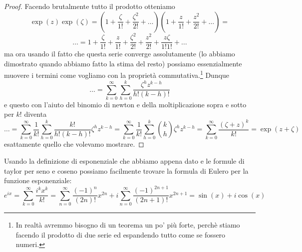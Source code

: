 \documentclass[11pt]{scrartcl}
\begin{document}
	 \begin{proof}
	 	Facendo brutalmente tutto il prodotto otteniamo
	 	$$\exp(z)\exp(\zeta)=\left(1+\frac{\zeta}{1!}+\frac{\zeta^2}{2!}+\dots\right)\left(1+\frac{z}{1!}+\frac{z^2}{2!}+\dots\right)=$$
	 	$$\dots=1+\frac{\zeta}{1!}+\frac{z}{1!}+\frac{\zeta^2}{2!}+\frac{z^2}{2!}+\frac{z\zeta}{1!1!}+\dots$$
	 	ma ora usando il fatto che questa serie converge assolutamente (lo abbiamo dimostrato quando abbiamo fatto la stima del resto) possiamo essenzialmente muovere i termini come vogliamo con la proprietà commutativa.\footnote{In realtà avremmo bisogno di un teorema un po' più forte, perchè stiamo facendo il prodotto di due serie ed espandendo tutto come se fossero numeri.} Dunque
	 	$$\dots=\sum_{k=0}^{\infty}\sum_{h=0}^k \frac{\zeta^h z^{k-h}}{h!(k-h)!}$$
	 	e questo con l'aiuto del binomio di newton e della moltiplicazione sopra e sotto per $k!$ diventa
	 	$$\dots=\sum_{k=0}^{\infty}\frac{1}{k!}\sum_{h=0}^k \frac{k!}{h!(k-h)!}\zeta^h z^{k-h}=\sum_{k=0}^{\infty}\frac{1}{k!}\sum_{h=0}^k \binom{k}{h}\zeta^h z^{k-h}=\sum_{k=0}^\infty \frac{(\zeta+z)^k}{k!}=\exp(z+\zeta)$$
	 	esattamente quello che volevamo mostrare. 
	 \end{proof}
	 \begin{example}
	 	Usando la definizione di esponenziale che abbiamo appena dato e le formule di taylor per seno e coseno possiamo facilmente trovare la formula di Eulero per la funzione esponenziale:
	 	$$e^{ix}=\sum_{k=0}^\infty \frac{i^k x^k}{k!}=\sum_{n=0}^{\infty}\frac{(-1)^n}{(2n)!}x^{2n}+i\sum_{n=0}^{\infty}\frac{(-1)^{2n+1}}{(2n+1)!}x^{2n+1}=\sin(x)+i\cos(x)$$
	 \end{example}
\end{document}
